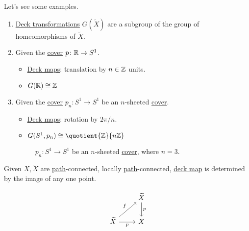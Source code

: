 \begin{eg}
	Let's see some examples.
	\begin{enumerate}
		\item \hyperref[def:deck-transformation]{Deck transformations} \(G(\widetilde{X} )\) are a subgroup of the group of homeomorphisms of \(\widetilde{X} \).
		\item Given the \hyperref[def:covering-map]{cover} \(p\colon \mathbb{\MakeUppercase{r}} \to S^1\).
		      \begin{itemize}
			      \item \hyperref[def:deck-transformation]{Deck maps}: translation by \(n\in \mathbb{\MakeUppercase{z}} \) units.
			      \item \(G(\mathbb{\MakeUppercase{r}} )\cong \mathbb{\MakeUppercase{z}} \)
		      \end{itemize}
		\item Given the \hyperref[def:covering-map]{cover} \(p_{n}\colon S^{1}\to S^1\) be an \(n\)-sheeted \hyperref[def:covering-map]{cover}.
		      \begin{itemize}
			      \item \hyperref[def:deck-transformation]{Deck maps}: rotation by \(2\pi / n\).
			      \item \(G(S^1, p_{n})\cong \quotient{\mathbb{\MakeUppercase{z}} }{n \mathbb{\MakeUppercase{z}} } \)
		      \end{itemize}
		      \begin{figure}[H]
			      \centering
			      \caption{\(p_{n} \colon S^1 \to S^1\) be an \(n\)-sheeted \hyperref[def:covering-map]{cover}, where \(n = 3\).}
			      \label{fig:eg:lec17:N-sheeted-cover}
		      \end{figure}
	\end{enumerate}
\end{eg}

\begin{exercise}\label{ex:lec17}
	Given \(X, \widetilde{X} \) are \hyperref[def:path]{path}-connected, locally \hyperref[def:path]{path}-connected,
	\hyperref[def:deck-transformation]{deck map} is determined by the image of any one point.
\end{exercise}
\begin{answer}
	\[
		\begin{tikzcd}
			& {\widetilde{X}} \\
			{\widetilde{X}} & X
			\arrow["f", from=2-1, to=1-2]
			\arrow["p"', from=2-1, to=2-2]
			\arrow["p", from=1-2, to=2-2]
		\end{tikzcd}
	\]
\end{answer}

